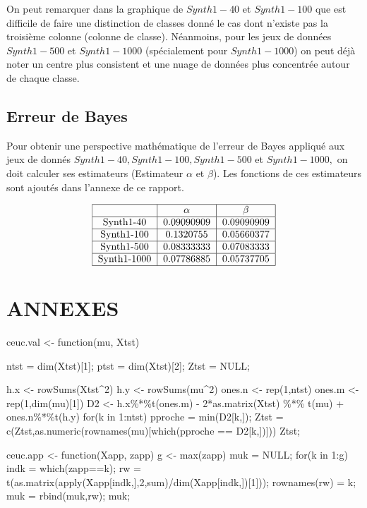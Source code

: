 \documentclass[a4paper,11pt]{article}
\begin{document}
On peut remarquer dans la graphique de $Synth1-40$ et $Synth1-100$ que est difficile de faire une distinction de classes donné le cas dont n'existe pas la troisième colonne (colonne de classe). Néanmoins, pour les jeux de données $Synth1-500$ et $Synth1-1000$ (spécialement pour $Synth1-1000$) on peut déjà noter un centre plus consistent et une nuage de données plus concentrée autour de chaque classe. 



\subsection*{Erreur de Bayes}

Pour obtenir une perspective mathématique de l'erreur de Bayes appliqué aux jeux de donnés $Synth1-40, Synth1-100, Synth1-500$ et $Synth1-1000,$ on doit calculer ses estimateurs (Estimateur $\alpha$ et $\beta$).
Les fonctions de ces estimateurs sont ajoutés dans l'annexe de ce rapport.


\[
\begin{tabular}{|c|c|c|}
\hline
 & $\alpha$ & $\beta$ \\
\hline
Synth1-40 & 0.09090909 & 0.09090909 \\
\hline
Synth1-100 & 0.1320755 & 0.05660377 \\
\hline
Synth1-500 & 0.08333333 & 0.07083333 \\
\hline
Synth1-1000 & 0.07786885 & 0.05737705 \\
\hline
\end{tabular}
\]
\pagebreak

\section*{ANNEXES}
      \begin{code}
      ceuc.val <- function(mu, Xtst){
	      ntst = dim(Xtst)[1];
	      ptst = dim(Xtst)[2];
	      Ztst = NULL;
	
	      h.x <- rowSums(Xtst^2)
	      h.y <- rowSums(mu^2)
	      ones.n <- rep(1,ntst)
	      ones.m <- rep(1,dim(mu)[1])
	      D2 <- h.x\%*\%t(ones.m) - 2*as.matrix(Xtst) \%*\% t(mu) + ones.n\%*\%t(h.y)
	      for(k in 1:ntst){
		      pproche = min(D2[k,]);
		      Ztst = c(Ztst,as.numeric(rownames(mu)[which(pproche == D2[k,])]))
	      }
	      Ztst;
      }
      \end{code}
      
      \begin{code}
      ceuc.app <- function(Xapp, zapp){
	      g <- max(zapp)
	      muk = NULL;
	      for(k in 1:g){
		      indk = which(zapp==k);
		      rw = t(as.matrix(apply(Xapp[indk,],2,sum)/dim(Xapp[indk,])[1]));
		      rownames(rw) = k;
		      muk = rbind(muk,rw);
	      }
	      muk;
      }
      \end{code}
      
\end{document}
